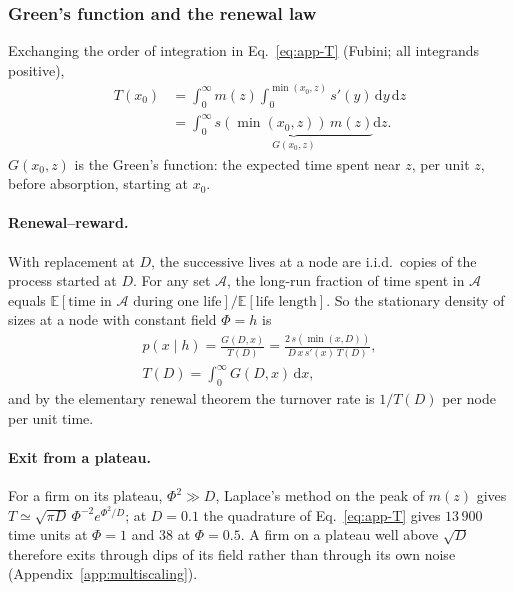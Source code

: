 \documentclass[pre,twocolumn,superscriptaddress,nofootinbib]{revtex4-2}
\newcommand{\E}{\mathbb E}
\newcommand{\dd}{\mathrm d}
\begin{document}
\subsubsection{Green's function and the renewal law}

Exchanging the order of integration in Eq.~\eqref{eq:app-T} (Fubini; all integrands positive),
\begin{equation}
\begin{split}
T(x_0)&=\int_0^\infty m(z)\int_0^{\min(x_0,z)}s'(y)\,\dd y\,\dd z\\
&=\int_0^\infty\underbrace{s(\min(x_0,z))\,m(z)}_{G(x_0,z)}\dd z .
\end{split}
\end{equation}
$G(x_0,z)$ is the Green's function: the expected time spent near $z$, per unit $z$, before absorption, starting at $x_0$.

\paragraph{Renewal--reward.}  With replacement at $D$, the successive lives at a node are i.i.d.\ copies of the
process started at $D$.  For any set $\mathcal A$, the long-run fraction of time spent in $\mathcal A$ equals
$\E[\text{time in }\mathcal A\text{ during one life}]/\E[\text{life length}]$.  So the stationary density of sizes at a node with constant field $\Phi=h$ is
\begin{equation}
\begin{gathered}
p(x\mid h)=\frac{G(D,x)}{T(D)}=\frac{2\,s(\min(x,D))}{D\,x\,s'(x)\,T(D)},\\
T(D)=\int_0^\infty G(D,x)\,\dd x,
\end{gathered}
\label{eq:renewal}
\end{equation}
and by the elementary renewal theorem the turnover rate is $1/T(D)$ per node per unit time.

\paragraph{Exit from a plateau.}  For a firm on its plateau, $\Phi^2\gg D$, Laplace's method on the peak of $m(z)$
gives $T\simeq\sqrt{\pi D}\,\Phi^{-2}e^{\Phi^2/D}$; at $D=0.1$ the quadrature of Eq.~\eqref{eq:app-T} gives $13\,900$
time units at $\Phi=1$ and $38$ at $\Phi=0.5$.  A firm on a plateau well above $\sqrt D$ therefore exits through
dips of its field rather than through its own noise (Appendix~\ref{app:multiscaling}).
\end{document}
